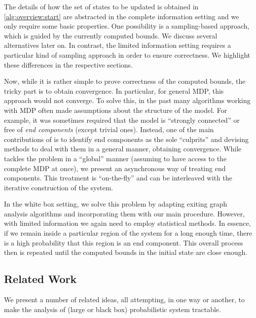 \documentclass{article}
\begin{document}
The details of how the set of states to be updated is obtained in \cref{alg:overview:start} are abstracted in the complete information setting and we only require some basic properties.
One possibility is a sampling-based approach, which is guided by the currently computed bounds.
We discuss several alternatives later on.
In contrast, the limited information setting requires a particular kind of sampling approach in order to ensure correctness.
We highlight these differences in the respective sections.

Now, while it is rather simple to prove correctness of the computed bounds, the tricky part is to obtain convergence.
In particular, for general MDP, this approach would not converge.
To solve this, in the past many algorithms working with MDP often made assumptions about the structure of the model.
For example, it was sometimes required that the model is \enquote{strongly connected} or free of \emph{end components} \cite{de1997formal} (except trivial ones).
Instead, one of the main contributions of \cite{DBLP:conf/rp/HaddadM14,DBLP:conf/atva/BrazdilCCFKKPU14} is to identify end components as the sole \enquote{culprits} and devising methods to deal with them in a general manner, obtaining convergence.
While \cite{DBLP:conf/rp/HaddadM14} tackles the problem in a \enquote{global} manner (assuming to have access to the complete MDP at once), we present an asynchronous way of treating end components.
This treatment is \enquote{on-the-fly} and can be interleaved with the iterative construction of the system. 

In the white box setting, we solve this problem by adapting exiting graph analysis algorithms and incorporating them with our main procedure.
However, with limited information we again need to employ statistical methods.
In essence, if we remain inside a particular region of the system for a long enough time, there is a high probability that this region is an end component.
This overall process then is repeated until the computed bounds in the initial state are close enough.

\subsection{Related Work}
We present a number of related ideas, all attempting, in one way or another, to make the analysis of (large or black box) probabilistic system tractable.
\end{document}
